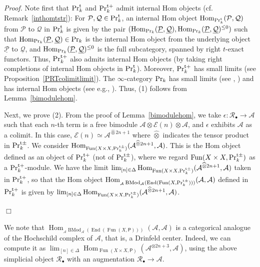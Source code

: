 \documentclass[leqno,12pt]{amsart}
\theoremstyle{plain}
\theoremstyle{definition}
\newcommand{\PR}{\textup{Pr}}
\newcommand{\PRT}{\textup{Pr}^{\textup{t}}}
\newcommand{\PRTT}{\textup{Pr}^{\textup{t}+}}
\newcommand{\PRTTT}{\textup{Pr}^{\textup{t}\pm}}
\newcommand{\Hom}{\operatorname{Hom}}
\newcommand{\Fun}{\operatorname{Fun}}
\newcommand{\End}{\operatorname{End}}
\newcommand{\BMod}{\operatorname{BMod}}
\newcommand{\Proof}{{\sl Proof.}\quad}
\newcommand{\QED}{{\unskip\nobreak\hfil\penalty50\quad\null\nobreak\hfil
{$\Box$}\parfillskip0pt\finalhyphendemerits0\par\medskip}}
\begin{document}
\Proof
Note first that $\PRT_k$ and $\PRTT_k$ admit internal Hom objects (cf. Remark~\ref{inthomtstr}):
For $\mathcal{P}, \mathcal{Q}\in \PRT_k$, an internal Hom object $\Hom_{\PRT_k}(\mathcal{P},\mathcal{Q})$ from $\mathcal{P}$ to $\mathcal{Q}$ in $\PRT_k$ is 
given  by the pair $(\Hom_{\PR_k}(\underline{\mathcal{P}},\underline{\mathcal{Q}}), \Hom_{\PR_k}(\underline{\mathcal{P}},\underline{\mathcal{Q}})^{\le0})$
such that $\Hom_{\PR_k}(\underline{\mathcal{P}},\underline{\mathcal{Q}})\in \PR_k$ 
is the internal Hom object from the underlying object $\underline{\mathcal{P}}$ to $\underline{\mathcal{Q}}$, and 
 $\Hom_{\PR_k}(\underline{\mathcal{P}},\underline{\mathcal{Q}})^{\le0}$ is the full subcategory, spanned by right $t$-exact functors.
Thus, $\PRTT_k$ also admits internal Hom objects (by taking right completions of internal Hom objects in $\PRT_k$).
Moreover, $\PRTT_k$ has small limits (see Proposition~\ref{PRTcolimitlimit}).
The $\infty$-category $\PR_k$ has small limits (see \cite[5.5.3.13]{HTT}, \cite[4.2.3.3]{HA})
and has internal Hom objects (see e.g., \cite[Lemma 5.1]{ID}).
Thus, (1) follows from Lemma~\ref{bimodulehom}.

Next, we prove (2).
From the proof of Lemma~\ref{bimodulehom}, 
we take $\epsilon:\mathcal{R}_\bullet\to \mathcal{A}$ 
such that each $n$-th term is a free bimodule $\mathcal{A}\otimes \mathcal{E}(n)\otimes \mathcal{A}$,
and $\epsilon$ exhibits $\mathcal{A}$ as a colimit.
In this case, $\mathcal{E}(n)\simeq \mathcal{A}^{\widehat{\otimes} 2n+1}$ where $\widehat{\otimes}$ indicates the tensor product
in $\PRTTT_k$.
We consider $\Hom_{\Fun(X\times X,\PRTTT_k)}(\mathcal{A}^{\widehat{\otimes} 2n+1},\mathcal{A})$.
This is the 
Hom object defined as an object of $\PRTT_k$ (not of $\PRTTT_k$), where we regard $\Fun(X\times X,\PRTTT_k)$ as a $\PRTT_k$-module.
We have the limit $\lim_{[n]\in \Delta}\Hom_{\Fun(X\times X,\PRTTT_k)}( \mathcal{A}^{\widehat{\otimes} 2n+1},\mathcal{A})$
taken in $\PRTT_k$, so that the Hom object $\Hom_{{}_{\mathcal{A}}\BMod_{\mathcal{A}}(\End(\Fun(X,\PRTTT_k)))}(\mathcal{A},\mathcal{A})$
defined in $\PRTT_k$ is given by $\lim_{[n]\in \Delta}\Hom_{\Fun(X\times X,\PRTTT_k)}( \mathcal{A}^{\widehat{\otimes} 2n+1},\mathcal{A})$.
\QED


We note that
$\Hom_{{}_{\mathcal{A}}\BMod_{\mathcal{A}}(\End(\Fun(X,\mathsf{P})))}(\mathcal{A},\mathcal{A})$
is a categorical analogue of the Hochschild complex of $\mathcal{A}$, that is, a Drinfeld center.
Indeed, we can compute it as $\lim_{[n]\in \Delta}\Hom_{\Fun(X\times X,\mathsf{P})}( \mathcal{A}^{\otimes 2n+3},\mathcal{A})$, using the above simplicial object $\mathcal{R}_\bullet$
with an augmentation $\mathcal{R}_\bullet\to \mathcal{A}$.
\end{document}
